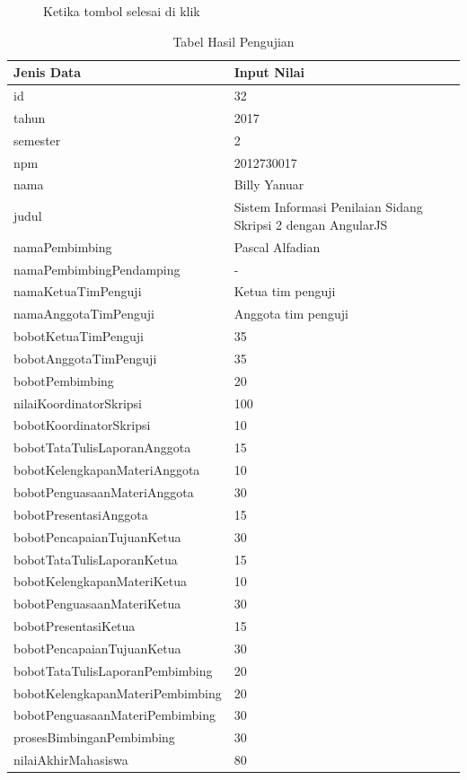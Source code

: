 \begin{enumerate}
\begin{figure}[H]
			\caption{Ketika tombol selesai di klik}
			\label{tab: hasilPeng}
		\end{figure}
		\begin{table}[htbp]
			\centering
			\caption{Tabel Hasil Pengujian}
			\begin{tabular}{| m{7cm} | m{5cm} |}
				\hline
				Jenis Data & Input Nilai\\
				\hline
				id & 32\\
				\hline
				tahun & 2017\\
				\hline
				semester & 2\\
				\hline
				npm & 2012730017\\
				\hline
				nama & Billy Yanuar\\
				\hline
				judul & Sistem Informasi Penilaian Sidang Skripsi 2 dengan AngularJS\\
				\hline
				namaPembimbing & Pascal Alfadian\\
				\hline
				namaPembimbingPendamping & -\\
				\hline
				namaKetuaTimPenguji & Ketua tim penguji\\
				\hline
				namaAnggotaTimPenguji & Anggota tim penguji\\
				\hline
				bobotKetuaTimPenguji & 35\\
				\hline
				bobotAnggotaTimPenguji & 35\\
				\hline
				bobotPembimbing & 20\\
				\hline
				nilaiKoordinatorSkripsi & 100\\
				\hline
				bobotKoordinatorSkripsi & 10\\
				\hline
				bobotTataTulisLaporanAnggota & 15\\
				\hline
				bobotKelengkapanMateriAnggota & 10\\
				\hline
				bobotPenguasaanMateriAnggota & 30\\
				\hline
				bobotPresentasiAnggota & 15\\
				\hline
				bobotPencapaianTujuanKetua & 30\\
				\hline
				bobotTataTulisLaporanKetua & 15\\
				\hline
				bobotKelengkapanMateriKetua & 10\\
				\hline
				bobotPenguasaanMateriKetua & 30\\
				\hline
				bobotPresentasiKetua & 15\\
				\hline
				bobotPencapaianTujuanKetua & 30\\
				\hline
				bobotTataTulisLaporanPembimbing & 20\\
				\hline
				bobotKelengkapanMateriPembimbing &20\\
				\hline
				bobotPenguasaanMateriPembimbing & 30\\
				\hline
				prosesBimbinganPembimbing & 30\\
				\hline
				nilaiAkhirMahasiswa & 80\\
				\hline
			\end{tabular}
		\end{table}
	\end{enumerate}
	
